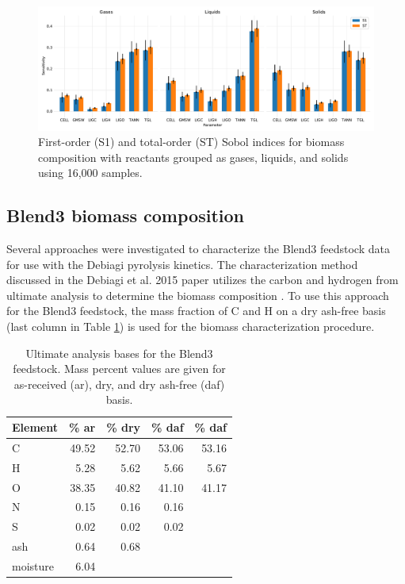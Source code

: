 \begin{figure}[H]
    \centering
    \includegraphics[width=\textwidth]{figures/sa-bar-n1000.pdf}
    \caption{First-order (S1) and total-order (ST) Sobol indices for biomass composition with reactants grouped as gases, liquids, and solids using 16,000 samples.}
    \label{fig:batch-sa3}
\end{figure}

\subsection{Blend3 biomass composition}

Several approaches were investigated to characterize the Blend3 feedstock data for use with the Debiagi pyrolysis kinetics. The characterization method discussed in the Debiagi et al. 2015 paper utilizes the carbon and hydrogen from ultimate analysis to determine the biomass composition \cite{Debiagi-2015}. To use this approach for the Blend3 feedstock, the mass fraction of C and H on a dry ash-free basis (last column in Table \ref{tab:blend3-ult-bases}) is used for the biomass characterization procedure.

\begin{table}[H]
    \centering
    \caption{Ultimate analysis bases for the Blend3 feedstock. Mass percent values are given for as-received (ar), dry, and dry ash-free (daf) basis.}
    \label{tab:blend3-ult-bases}
    \begin{tabular}{lrrrr}
        \toprule
        Element & \% ar & \% dry & \% daf & \% daf \\
        \midrule
        C        & 49.52 & 52.70 & 53.06 & 53.16 \\
        H        & 5.28  & 5.62  & 5.66  & 5.67  \\
        O        & 38.35 & 40.82 & 41.10 & 41.17 \\
        N        & 0.15  & 0.16  & 0.16  &       \\
        S        & 0.02  & 0.02  & 0.02  &       \\
        ash      & 0.64  & 0.68  &       &       \\
        moisture & 6.04  &       &       &       \\
        \bottomrule
    \end{tabular}
\end{table}

